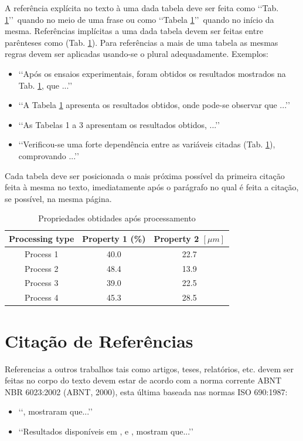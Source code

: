 A referência explícita no texto à uma dada tabela deve ser feita como 
\lq\lq Tab. \ref{tab04}\rq\rq\ quando no meio de uma frase ou como 
\lq\lq Tabela \ref{tab04}\rq\rq\ quando no início da mesma. Referências 
implícitas a uma dada tabela devem ser feitas entre parênteses como 
(Tab. \ref{tab04}). Para referências a mais de uma tabela as mesmas 
regras devem ser aplicadas usando-se o plural adequadamente. Exemplos:
\begin{itemize}
	\item \lq\lq Após os ensaios experimentais, foram obtidos os resultados 
	mostrados na Tab. \ref{tab04}, que ...\rq\rq
	\item \lq\lq A Tabela \ref{tab04} apresenta os resultados obtidos, onde 
	pode-se observar que ...\rq\rq
	\item \lq\lq As Tabelas 1 a 3 apresentam os resultados obtidos, ...\rq\rq
	\item \lq\lq Verificou-se uma forte dependência entre as variáveis citadas 
	(Tab. \ref{tab04}), comprovando ...\rq\rq
\end{itemize}

Cada tabela deve ser posicionada o mais próxima possível da primeira citação 
feita à mesma no texto, imediatamente após o parágrafo no qual é feita a 
citação, se possível, na mesma página.

\begin{table}[h]
	\centering
	\caption{Propriedades obtidades após processamento}
	\label{tab04}
	
	\begin{tabular}{ccc}
		\toprule
		\textbf{Processing type} & \textbf{Property 1} (\%) & 
		\textbf{Property 2} $[\mu m]$ \\
		\midrule
		Process 1 & 40.0 & 22.7 \\
		Process 2 & 48.4 & 13.9 \\
		Process 3 & 39.0 & 22.5 \\
		Process 4 & 45.3 & 28.5 \\
		\bottomrule
	\end{tabular}
\end{table}

\section{Citação de Referências}

Referencias a outros trabalhos tais como artigos, teses, relatórios, etc. devem 
ser feitas no corpo do texto devem estar de acordo com a norma corrente ABNT 
NBR 6023:2002 (ABNT, 2000), esta última baseada nas normas ISO 690:1987:
\begin{itemize}
	\item \lq\lq , mostraram que...\rq\rq

	\item \lq\lq Resultados disponíveis em , 
	e , mostram que...\rq\rq
\end{itemize}

